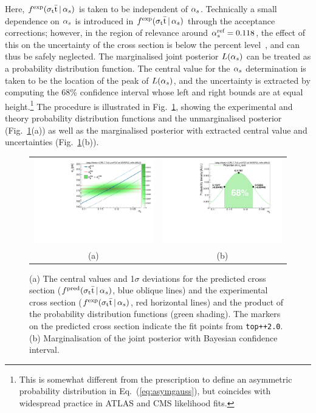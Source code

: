 %
Here, $f^{\text{exp}}(\sigma_\mathrm{t}\bar{\mathrm{t}}\,|\,\alpha_s)$ is taken to be independent of
$\alpha_s$. Technically a small dependence on $\alpha_s$ is introduced in
$f^{\text{exp}}(\sigma_\mathrm{t}\bar{\mathrm{t}}\,|\,\alpha_s)$ through the acceptance corrections;
however, in the region of relevance around $\alpha_s^{\text{ref}} = 0.118$,
the effect of this on the uncertainty of the cross section is below
the percent level~\cite{CMS-ttbar-alphas}, and can thus be safely
neglected.  
%
The marginalised joint posterior $L(\alpha_s)$ can be treated
as a probability distribution function. 
%
The central value for the $\alpha_s$ determination is taken to be the
location of the peak of $L(\alpha_s)$, and the
%
uncertainty is extracted by computing the 68\% confidence interval
whose left and right bounds are at equal height.\footnote{This is
  somewhat different from the prescription to define an asymmetric
  probability distribution in Eq.~(\ref{eq:asymgauss}), but coincides
  with widespread practice in ATLAS and CMS likelihood fits.}
%
The procedure is illustrated in Fig.~\ref{fig:fullproc}, showing the
experimental and theory probability distribution functions and the
unmarginalised posterior (Fig.~\ref{fig:fullproc}(a)) as well as the
marginalised posterior with extracted central value and uncertainties
(Fig.~\ref{fig:fullproc}(b)).


\begin{figure}[htb]
\centering
\begin{tabular}{cc}
\includegraphics[width=0.5\linewidth]{img/alphas/fullproc.pdf}
&
\includegraphics[width=0.5\linewidth]{img/alphas/alphasDistribution.pdf}
\\
(a) & (b)
\end{tabular}
\vspace{-0.3cm}
\caption{
  (a) The central values and 1$\sigma$ deviations for the predicted cross
  section ($f^{\text{pred}}(\sigma_\mathrm{t}\bar{\mathrm{t}}\,|\,\alpha_s)$, blue oblique lines) and
  the experimental cross section ($f^{\text{exp}}(\sigma_\mathrm{t}\bar{\mathrm{t}}\,|\,\alpha_s)$,
  red horizontal lines) 
  and the product of the probability distribution functions (green
  shading).
  The markers on the predicted cross
  section indicate the fit points from \texttt{top++2.0}. (b)
  Marginalisation of the joint posterior with Bayesian confidence
  interval.
  }
\label{fig:fullproc}
\end{figure}


